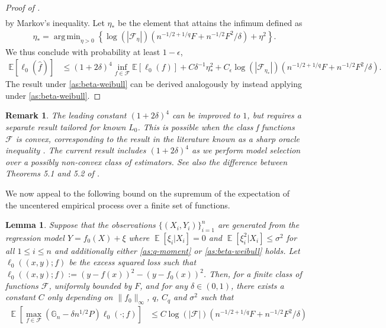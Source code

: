 \documentclass[12pt]{article}
\DeclareMathOperator*{\argmin}{arg\,min}
\DeclareMathOperator*{\E}{\mathbb{E}}
\newtheorem{lemma}[theorem]{Lemma}
\newtheorem{remark}{Remark}[section]
\begin{document}
\begin{appendices}
\begin{proof}[Proof of ]
\begin{align*}
\end{align*}
by Markov's inequality. Let $\eta_*$ be the element that attains the infimum defined as 
\begin{align*}
    \eta_* = \argmin_{\eta > 0 }\left\{\log (|\mathcal{F_\eta}|)\left(n^{-1/2+1/q}F + n^{-1/2}F^2/\delta\right) + \eta^2\right\}.
\end{align*}
We thus conclude with probability at least $1-\epsilon$,
\begin{align*}
    \mathbb{E}[\ell_0(\widehat{f})] & \leq (1+2\delta)^4 \inf_{f \in \mathcal{F}}\mathbb{E}[\ell_0(f)] + C\delta^{-1}\eta_*^2 + C_\epsilon \log (|\mathcal{F_{\eta_*}}|)\left(n^{-1/2+1/q}F + n^{-1/2}F^2/\delta\right).
\end{align*}
The result under \ref{as:beta-weibull} can be derived analogously by instead applying  under \ref{as:beta-weibull}. 
\end{proof}
\begin{remark}
    The leading constant $(1+2\delta)^4$ can be improved to $1$, but requires a separate result tailored for known $L_0$. This is possible when the class f functions $\mathcal{F}$ is convex, corresponding to the result in the literature known as a sharp oracle inequality \cite{bellec2018sharp}. The current result includes $(1+2\delta)^4$ as we perform model selection over a possibly non-convex class of estimators. See also the difference between Theorems 5.1 and 5.2 of \cite{koltchinskii2011oracle}.
\end{remark}
We now appeal to the following bound on the supremum of the expectation of the uncentered empirical process over a finite set of functions. 
\begin{lemma}\label{lemma:bound-on-uncentered-empirical-process}
 Suppose that the observations $\{(X_i, Y_i)\}_{i=1}^n$ are generated from the regression model $Y=f_0(X) + \xi$ where $\E[\xi_i|X_i]=0$ and $\E[\xi_i^2 |X_i]\le \sigma^2$ for all $1\le i \le n$ and additionally either \ref{as:q-moment} or \ref{as:beta-weibull} holds. Let $\ell_0((x,y); f)$ be the excess squared loss such that $\ell_0((x,y); f):=(y-f(x))^2 - (y-f_0(x))^2$. Then, for a finite class of functions $\mathcal{F}$, uniformly bounded by $F$, and for any $\delta \in (0,1)$, there exists a constant $C$ only depending on $\|f_0\|_\infty$, $q$, $C_q$ and $\sigma^2$ such that
 \begin{align}
     \E\left[\max_{f \in \mathcal{F}}\left(\mathbb{G}_n -\delta n^{1/2}P\right)\ell_0(\cdot; f)\right]&\le C\log (|\mathcal{F}|)\left(n^{-1/2+1/q}F + n^{-1/2}F^2/\delta\right) 

\end{align}
\end{lemma}
\end{appendices}
\end{document}
